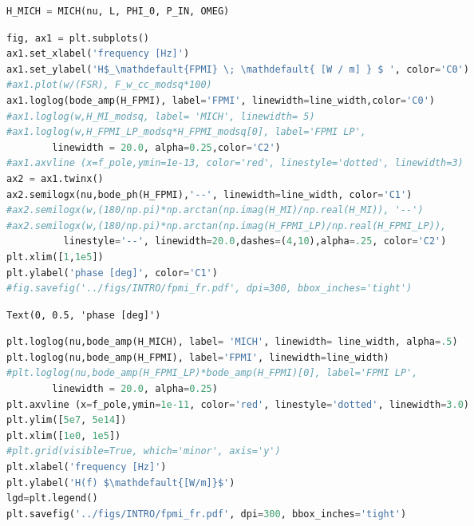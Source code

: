 \begin{spacing}{1} \begin{lstlisting}[frame=single, language=Python]
H_MICH = MICH(nu, L, PHI_0, P_IN, OMEG)
\end{lstlisting} \end{spacing}

\begin{spacing}{1} \begin{lstlisting}[frame=single, language=Python]
fig, ax1 = plt.subplots()
ax1.set_xlabel('frequency [Hz]')
ax1.set_ylabel('H$_\mathdefault{FPMI} \; \mathdefault{ [W / m] } $ ', color='C0')
#ax1.plot(w/(FSR), F_w_cc_modsq*100)
ax1.loglog(bode_amp(H_FPMI), label='FPMI', linewidth=line_width,color='C0')
#ax1.loglog(w,H_MI_modsq, label= 'MICH', linewidth= 5)
#ax1.loglog(w,H_FPMI_LP_modsq*H_FPMI_modsq[0], label='FPMI LP', 
	    linewidth = 20.0, alpha=0.25,color='C2')
#ax1.axvline (x=f_pole,ymin=1e-13, color='red', linestyle='dotted', linewidth=3)
ax2 = ax1.twinx()
ax2.semilogx(nu,bode_ph(H_FPMI),'--', linewidth=line_width, color='C1')
#ax2.semilogx(w,(180/np.pi)*np.arctan(np.imag(H_MI)/np.real(H_MI)), '--')
#ax2.semilogx(w,(180/np.pi)*np.arctan(np.imag(H_FPMI_LP)/np.real(H_FPMI_LP)),
	      linestyle='--', linewidth=20.0,dashes=(4,10),alpha=.25, color='C2')
plt.xlim([1,1e5])
plt.ylabel('phase [deg]', color='C1')
#fig.savefig('../figs/INTRO/fpmi_fr.pdf', dpi=300, bbox_inches='tight')
\end{lstlisting} \end{spacing}

\begin{spacing}{1} \begin{lstlisting}
Text(0, 0.5, 'phase [deg]')
\end{lstlisting} \end{spacing}

\begin{spacing}{1} \begin{lstlisting}[frame=single, language=Python]
plt.loglog(nu,bode_amp(H_MICH), label= 'MICH', linewidth= line_width, alpha=.5)
plt.loglog(nu,bode_amp(H_FPMI), label='FPMI', linewidth=line_width)
#plt.loglog(nu,bode_amp(H_FPMI_LP)*bode_amp(H_FPMI)[0], label='FPMI LP', 
	    linewidth = 20.0, alpha=0.25)
plt.axvline (x=f_pole,ymin=1e-11, color='red', linestyle='dotted', linewidth=3.0)
plt.ylim([5e7, 5e14])
plt.xlim([1e0, 1e5])
#plt.grid(visible=True, which='minor', axis='y')
plt.xlabel('frequency [Hz]')
plt.ylabel('H(f) $\mathdefault{[W/m]}$')
lgd=plt.legend()
plt.savefig('../figs/INTRO/fpmi_fr.pdf', dpi=300, bbox_inches='tight')
\end{lstlisting} \end{spacing}

